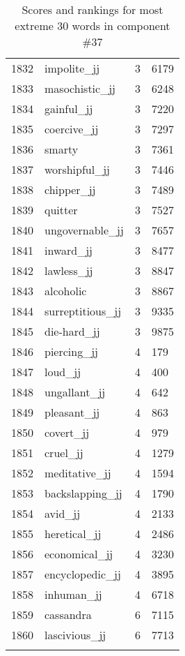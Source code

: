 \begin{longtable}[!htbp]{| rlr@{.}l |}
    1832 & impolite\_jj & 3 & 6179 \\
    1833 & masochistic\_jj & 3 & 6248 \\
    1834 & gainful\_jj & 3 & 7220 \\
    1835 & coercive\_jj & 3 & 7297 \\
    1836 & smarty & 3 & 7361 \\
    1837 & worshipful\_jj & 3 & 7446 \\
    1838 & chipper\_jj & 3 & 7489 \\
    1839 & quitter & 3 & 7527 \\
    1840 & ungovernable\_jj & 3 & 7657 \\
    1841 & inward\_jj & 3 & 8477 \\
    1842 & lawless\_jj & 3 & 8847 \\
    1843 & alcoholic & 3 & 8867 \\
    1844 & surreptitious\_jj & 3 & 9335 \\
    1845 & die-hard\_jj & 3 & 9875 \\
    1846 & piercing\_jj & 4 & 179 \\
    1847 & loud\_jj & 4 & 400 \\
    1848 & ungallant\_jj & 4 & 642 \\
    1849 & pleasant\_jj & 4 & 863 \\
    1850 & covert\_jj & 4 & 979 \\
    1851 & cruel\_jj & 4 & 1279 \\
    1852 & meditative\_jj & 4 & 1594 \\
    1853 & backslapping\_jj & 4 & 1790 \\
    1854 & avid\_jj & 4 & 2133 \\
    1855 & heretical\_jj & 4 & 2486 \\
    1856 & economical\_jj & 4 & 3230 \\
    1857 & encyclopedic\_jj & 4 & 3895 \\
    1858 & inhuman\_jj & 4 & 6718 \\
    1859 & cassandra & 6 & 7115 \\
    1860 & lascivious\_jj & 6 & 7713 \\
    \hline
    \caption{Scores and rankings for most extreme 30 words in component \#37} \\
\end{longtable}
